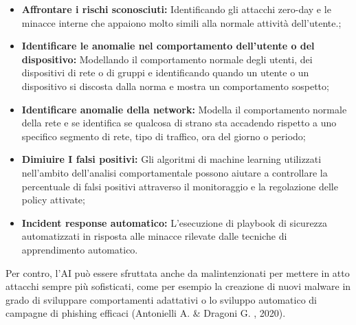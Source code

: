 \begin{itemize}
    \item\textbf{Affrontare i rischi sconosciuti:} Identificando gli attacchi zero-day e le minacce interne che appaiono molto simili alla normale attività dell'utente.; 
    \item\textbf{Identificare le anomalie nel comportamento dell'utente o del dispositivo:} Modellando il comportamento normale degli utenti, dei dispositivi di rete o di gruppi e identificando quando un utente o un dispositivo si discosta dalla norma e mostra un comportamento sospetto;
    \item\textbf{Identificare anomalie della network:} Modella il comportamento normale della rete e se identifica se qualcosa di strano sta accadendo rispetto a uno specifico segmento di rete, tipo di traffico, ora del giorno o periodo;
    \item\textbf{Dimiuire I falsi positivi:} Gli algoritmi di machine learning utilizzati nell'ambito dell'analisi comportamentale possono aiutare a controllare la percentuale di falsi positivi attraverso il monitoraggio e la regolazione delle policy attivate;
    \item\textbf{Incident response automatico: } L'esecuzione di playbook di sicurezza automatizzati in risposta alle minacce rilevate dalle tecniche di apprendimento automatico.
\end{itemize}

Per contro, l’AI può essere sfruttata anche da malintenzionati per mettere in atto attacchi sempre più sofisticati, come per esempio la creazione di nuovi malware in grado di sviluppare comportamenti adattativi o lo sviluppo automatico di campagne di phishing efficaci (Antonielli A. \& Dragoni G. , 2020).

